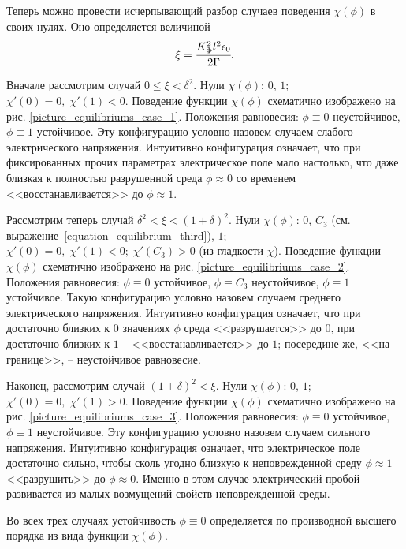 \documentclass[a4paper,12pt]{article}
\theoremstyle{plain}
\theoremstyle{definition}
\begin{document}
Теперь можно провести исчерпывающий разбор случаев поведения $\chi(\phi)$ в своих нулях. Оно определяется величиной
\begin{equation}
    \xi = \cfrac{K_\Phi^2 l^2 \epsilon_0}{2 \Gamma} \text{.}
    \label{characteristic_equilibriums}
\end{equation}

Вначале рассмотрим случай $0 \leqslant \xi < \delta^2$. Нули $\chi(\phi)$: $0$, $1$; $\chi'(0) = 0, \; \chi'(1) < 0$. Поведение функции $\chi(\phi)$ схематично изображено на рис. \ref{picture_equilibriums_case_1}. Положения равновесия: $\phi \equiv 0$ неустойчивое, $\phi \equiv 1$ устойчивое. Эту конфигурацию условно назовем случаем слабого электрического напряжения. Интуитивно конфигурация означает, что при фиксированных прочих параметрах электрическое поле мало настолько, что даже близкая к полностью разрушенной среда $\phi \approx 0$ со временем <<восстанавливается>> до $\phi \approx 1$.

Рассмотрим теперь случай $\delta^2 < \xi < (1 + \delta)^2$. Нули $\chi(\phi)$: $0$, $C_3$ (см. выражение~\eqref{equation_equilibrium_third}), $1$; $\chi'(0) = 0, \; \chi'(1) < 0; \; \chi'(C_3) > 0$ (из гладкости $\chi$). Поведение функции $\chi(\phi)$ схематично изображено на рис. \ref{picture_equilibriums_case_2}. Положения равновесия: $\phi \equiv 0$ устойчивое, $\phi \equiv C_3$ неустойчивое, $\phi \equiv 1$ устойчивое. Такую конфигурацию условно назовем случаем среднего электрического напряжения. Интуитивно конфигурация означает, что при достаточно близких к $0$ значениях $\phi$ среда <<разрушается>> до $0$, при достаточно близких к $1$ -- <<восстанавливается>> до $1$; посередине же, <<на границе>>, -- неустойчивое равновесие.

Наконец, рассмотрим случай $(1 + \delta)^2 < \xi$. Нули $\chi(\phi)$: $0$, $1$; $\chi'(0) = 0, \; \chi'(1) > 0$. Поведение функции $\chi(\phi)$ схематично изображено на рис. \ref{picture_equilibriums_case_3}. Положения равновесия: $\phi \equiv 0$ устойчивое, $\phi \equiv 1$ неустойчивое. Эту конфигурацию условно назовем случаем сильного напряжения. Интуитивно конфигурация означает, что электрическое поле достаточно сильно, чтобы сколь угодно близкую к неповрежденной среду $\phi \approx 1$ <<разрушить>> до $\phi \approx 0$. Именно в этом случае электрический пробой развивается из малых возмущений свойств неповрежденной среды.

Во всех трех случаях устойчивость $\phi \equiv 0$ определяется по производной высшего порядка из вида функции $\chi(\phi)$.
\end{document}
